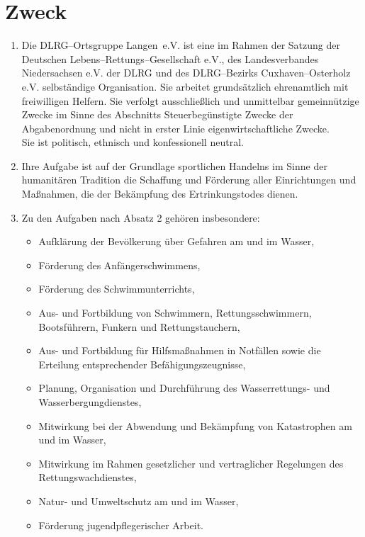 \documentclass[%
12pt, %
a4paper, %
headsepline, %
footsepline, %
parskip, %
headings=normal, %
]{scrartcl}
\begin{document}
\section{Zweck}
\label{sec:zweck}
\begin{enumerate}
    \item Die DLRG--Ortsgruppe Langen~e.V. ist eine im Rahmen der Satzung der Deutschen Lebens--Rettungs--Gesellschaft e.V., des Landesverbandes Niedersachsen e.V. der DLRG und des DLRG--Bezirks Cuxhaven--Osterholz e.V. selbständige Organisation. Sie arbeitet grundsätzlich ehrenamtlich mit freiwilligen Helfern. Sie verfolgt ausschließlich und unmittelbar gemeinnützige Zwecke im Sinne des Abschnitts \glqq{}Steuerbegünstigte Zwecke\grqq{} der Abgabenordnung und nicht in erster Linie eigenwirtschaftliche Zwecke.\\
      Sie ist politisch, ethnisch und konfessionell neutral.
    \item Ihre Aufgabe ist auf der Grundlage sportlichen Handelns im Sinne der humanitären Tradition die Schaffung und Förderung aller Einrichtungen und Maßnahmen, die der Bekämpfung des Ertrinkungstodes dienen.
    \item Zu den Aufgaben nach Absatz 2 gehören insbesondere:\begin{itemize}
        \item Aufklärung der Bevölkerung über Gefahren am und im Wasser,
        \item Förderung des Anfängerschwimmens,
        \item Förderung des Schwimmunterrichts,
        \item Aus- und Fortbildung von Schwimmern, Rettungsschwimmern, Bootsführern, Funkern und Rettungstauchern,
        \item Aus- und Fortbildung für Hilfsmaßnahmen in Notfällen sowie die Erteilung entsprechender Befähigungszeugnisse,
        \item Planung, Organisation und Durchführung des Wasserrettungs- und Wasserbergungdienstes,
        \item Mitwirkung bei der Abwendung und Bekämpfung von Katastrophen am und im Wasser,
        \item Mitwirkung im Rahmen gesetzlicher und vertraglicher Regelungen des Rettungswachdienstes,
        \item Natur- und Umweltschutz am und im Wasser,
        \item Förderung jugendpflegerischer Arbeit.
    \end{itemize}

\end{enumerate}
\end{document}

